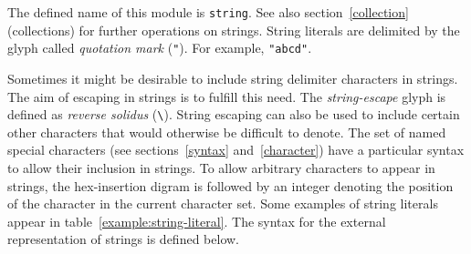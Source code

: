 \label{string}
\begin{optDefinition}
The defined name of this module is {\tt string}.  See also
section~\ref{collection} (collections) for further operations on
strings.
%
%
String literals are
delimited by the glyph called {\em quotation mark\/} (\verb+"+).  For
example, \verb+"abcd"+.

Sometimes it might be desirable to include string delimiter characters in
strings.  The aim of escaping in strings  is
to fulfill this need.  The {\em string-escape\/}
 glyph is defined as {\em reverse
    solidus\/} (\verb+\+).  String escaping can also be used to include certain
other characters that would otherwise be difficult to denote.  The set of named
special characters (see sections~\ref{syntax} and~\ref{character}) have a
particular syntax to allow their inclusion in strings.  To allow arbitrary
characters to appear in strings, the hex-insertion digram is followed by an
integer denoting the position of the character in the current character set.
Some examples of string literals appear in table~\ref{example:string-literal}.
The syntax for the external representation of strings is defined below.
%
\Syntax
\label{string-syntax}
%


\end{optDefinition}
